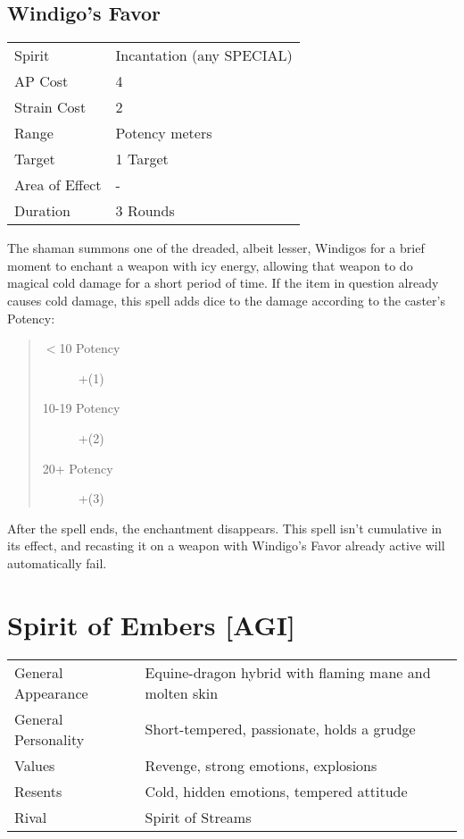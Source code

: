\documentclass[11pt,a4paper,twocolumn]{book}
\begin{document}
\subsection*{Windigo's Favor}
{
	\begin{tabu} to 75mm{| X[l,4] | X[l,7] |}
		\hline
		Spirit         & Incantation (any SPECIAL) \\
		AP Cost        & 4                         \\
		Strain Cost    & 2                         \\
		Range          & Potency meters            \\
		Target         & 1 Target                  \\
		Area of Effect & -                         \\
		Duration       & 3 Rounds                  \\ \hline
	\end{tabu}
	
}

\medskip

The shaman summons one of the dreaded, albeit lesser, Windigos for a brief moment to enchant a weapon with icy energy, allowing that weapon to do magical cold damage for a short period of time. If the item in question already causes cold damage, this spell adds dice to the damage according to the caster's Potency:

\begin{quote}
	\begin{description}
		\item[$<$10 Potency] 	+(1)
		\item[10-19 Potency] 	+(2)
		\item[20+ Potency] 	    +(3)
	\end{description}
\end{quote}

After the spell ends, the enchantment disappears. This spell isn't cumulative in its effect, and recasting it on a weapon with Windigo's Favor already active will automatically fail.

\section*{Spirit of Embers [AGI]}
{
	\begin{tabu} to 75mm{| X[l,4] | X[l,8] |}
		\hline
		General Appearance  & Equine-dragon hybrid with flaming mane and molten skin \\
		General Personality & Short-tempered, passionate, holds a grudge             \\
		Values              & Revenge, strong emotions, explosions                   \\
		Resents             & Cold, hidden emotions, tempered attitude               \\
		Rival               & Spirit of Streams                                      \\ \hline
	\end{tabu}
	
}
\end{document}
